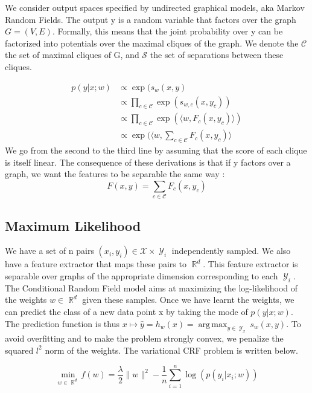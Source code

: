 \documentclass{article}
\DeclareMathOperator{\R}{\mathbb{R}}
\DeclareMathOperator{\1}{\mathbb{1}}
\DeclareMathOperator{\Y}{\mathcal{Y}}
\DeclareMathOperator*{\argmax}{arg\,max}
\begin{document}
We consider output spaces specified by undirected graphical models, aka Markov Random Fields.
The output y is a random variable that factors over the graph $G=(V,E)$.
Formally, this means that the joint probability over y can be factorized into potentials over the maximal cliques of the graph.
We denote the $\mathcal{C}$ the set of maximal cliques of G, and $\mathcal{S}$ the set of separations between these cliques.

\begin{align*}
	p(y|x ; w) & \propto  \exp(s_w(x, y) \\
	& \propto \prod_{c\in \mathcal{C}} \exp(s_{w, c}(x, y_c))\\
	& \propto  \prod_{c\in \mathcal{C}} \exp(\langle w, F_c(x, y_c) \rangle) \\
	& \propto \exp( \langle w, \sum_{c\in \mathcal{C}} F_c(x, y_c) \rangle 
\end{align*}
We go from the second to the third line by assuming that the score of each clique is itself linear.
The consequence of these derivations is that if y factors over a graph, we want the features to be separable the same way :
\begin{equation}
	F(x, y) =  \sum_{c\in \mathcal{C}} F_c(x, y_c)
\end{equation}


\subsection{Maximum Likelihood}

We have a set of n pairs $(x_i, y_i) \in \mathcal{X} \times \Y_i$ independently sampled.
We also have a feature extractor that maps these pairs to $\R^d$.
This feature extractor is separable over graphs of the appropriate dimension corresponding to each $\Y_i$.
The Conditional Random Field model aims at maximizing the log-likelihood of the weights $w\in \R^d$ given these samples.
Once we have learnt the weights, we can predict the class of a new data point x by taking the mode of $p(y|x ; w)$.
The prediction function is thus $x \mapsto \hat{y} = h_w(x) = \argmax_{y\in \Y_x} s_w(x, y)$.
To avoid overfitting and to make the problem strongly convex, we penalize the squared $l^2$ norm of the weights.
The variational CRF problem is written below.

\begin{equation}
\min_{w\in\R^d} f(w) = \frac{\lambda}{2}\|w\|^2 - \frac{1}{n}   \sum_{i=1}^{n} \log(p(y_i|x_i; w))	
\end{equation}
\end{document}
